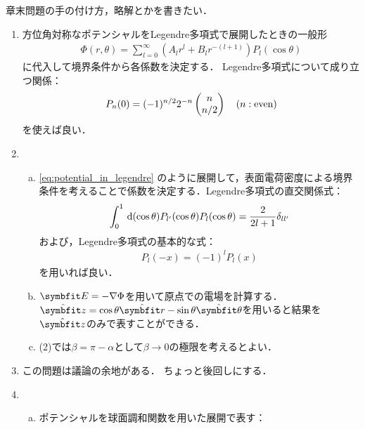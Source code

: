 章末問題の手の付け方，略解とかを書きたい．
\begin{enumerate}[label=\fbox{\textbf{\thesection.\arabic*}}]
  \item 方位角対称なポテンシャルをLegendre多項式で展開したときの一般形
    \begin{gather}
      \label{eq:potential_in_legendre}
      \Phi(r, \theta) = \sum_{l=0}^\infty (A_l r^l + B_l r^{-(l+1)})P_l(\cos\theta)
    \end{gather}
    に代入して境界条件から各係数を決定する．
    Legendre多項式について成り立つ関係：
    \begin{gather}
      P_n(0) = (-1)^{n/2} 2^{-n} \left(\begin{matrix}n\\n/2\end{matrix}\right) \hspace{1em} (n : \text{even})
    \end{gather}
    を使えば良い．
  \item 
    \begin{enumerate}[(a)]  
      \item \eqref{eq:potential_in_legendre}
        のように展開して，表面電荷密度による境界条件を考えることで係数を決定する．Legendre多項式の直交関係式：
        \begin{gather}
          \int_0^1 \dl{(\cos\theta)} P_{l'}(\cos\theta) P_l(\cos\theta) = \frac{2}{2l+1} \delta_{ll'}
        \end{gather}
        および，Legendre多項式の基本的な式：
        \begin{gather}
          P_l(-x) = (-1)^l P_l(x)
        \end{gather}
        を用いれば良い．
      \item $\bs{E} = - \gr \Phi$を用いて原点での電場を計算する．$\hat{\bs{z}} = \cos\theta\hat{\bs{r}} - \sin\theta \hat{\bs{\theta}}$を用いると結果を$\hat{\bs{z}}$のみで表すことができる．
      \item (2)では$\beta = \pi - \alpha$として$\beta \to 0$の極限を考えるとよい．
    \end{enumerate}
  \item この問題は議論の余地がある．
    ちょっと後回しにする．
  \item
    \begin{enumerate}[(a)]  
      \item  
        ポテンシャルを球面調和関数を用いた展開で表す：


\end{enumerate}
\end{enumerate}
